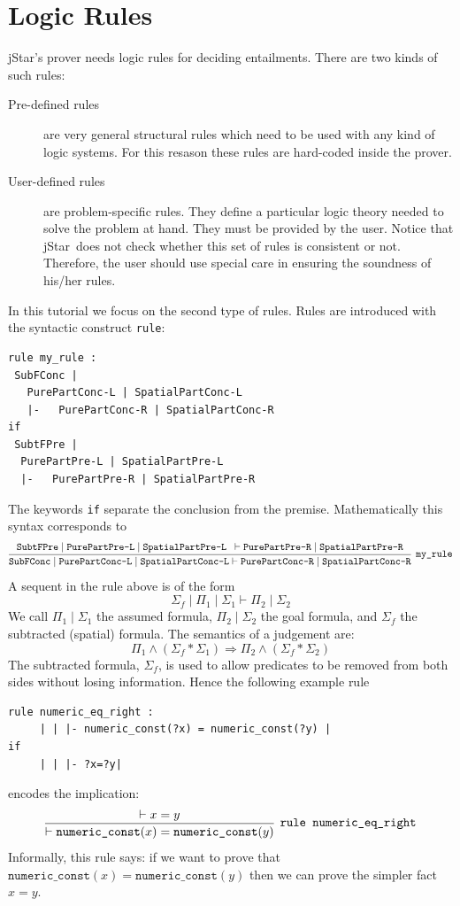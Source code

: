 \documentclass[11pt]{article}
\newcommand{\jStar}{{\sf jStar}}
\begin{document}
\section{Logic Rules}
\label{sec:logic-rules}
\jStar's  prover needs logic rules for deciding entailments. There are
two kinds of such rules:\begin{description}
\item[Pre-defined rules] are very general structural rules which need
  to be used with any kind of logic systems. For this resason these
  rules are hard-coded inside the prover.
\item[User-defined rules] are problem-specific rules. They define a
  particular logic theory needed to solve the problem at hand. They
  must be provided by the user. Notice that \jStar \ does not check whether this set of rules is 
  consistent or not. Therefore, the user should use special care in ensuring the soundness of his/her rules.
\end{description} 
In this tutorial we focus on the second type of rules. Rules are introduced with
the syntactic construct {\tt rule}:
\begin{verbatim}
rule my_rule :
 SubFConc | 
   PurePartConc-L | SpatialPartConc-L 
   |-   PurePartConc-R | SpatialPartConc-R 
if 
 SubtFPre |
  PurePartPre-L | SpatialPartPre-L 
  |-   PurePartPre-R | SpatialPartPre-R 
\end{verbatim}
The keywords {\tt if} separate the conclusion from the premise.
Mathematically this syntax corresponds to
\[
\infer[\texttt{my\_rule}]
{
 \texttt{SubFConc} \mid 
   \texttt{PurePartConc-L} \mid \texttt{SpatialPartConc-L} 
   \vdash   \texttt{PurePartConc-R} \mid \texttt{SpatialPartConc-R} }
{ \texttt{SubtFPre} \mid
  \texttt{PurePartPre-L} \mid \texttt{SpatialPartPre-L }
  \vdash   \texttt{PurePartPre-R} \mid \texttt{SpatialPartPre-R}} 
\]
A sequent in the rule above is of the form
\[
\Sigma_f \mid \Pi_1 \mid \Sigma_1 \vdash \Pi_2 \mid \Sigma_2 
\]
We call $\Pi_1 \mid \Sigma_1$ the assumed formula, $\Pi_2 \mid
\Sigma_2$ the goal formula, and $\Sigma_f$ the subtracted (spatial)
formula. The semantics of a judgement are:
\[
\Pi_1 \land (\Sigma_f * \Sigma_1) 
\Longrightarrow
\Pi_2 \land (\Sigma_f * \Sigma_2) 
\]
The subtracted formula, $\Sigma_f$, is used to allow predicates to be
removed from both sides without losing information. Hence the 
following example rule 
\begin{verbatim}
rule numeric_eq_right :
     | | |- numeric_const(?x) = numeric_const(?y) |
if
     | | |- ?x=?y|
\end{verbatim}
encodes the implication:
\[
\infer[\texttt{rule numeric\_eq\_right}]{ \vdash \texttt{numeric\_const}(x) = \texttt{numeric\_const}(y)}{ \vdash x=y}
\]
Informally, this rule says: if we want to prove that $\texttt{numeric\_const}(x) = \texttt{numeric\_const}(y)$ then we can prove the simpler fact $x=y$.
\end{document}
